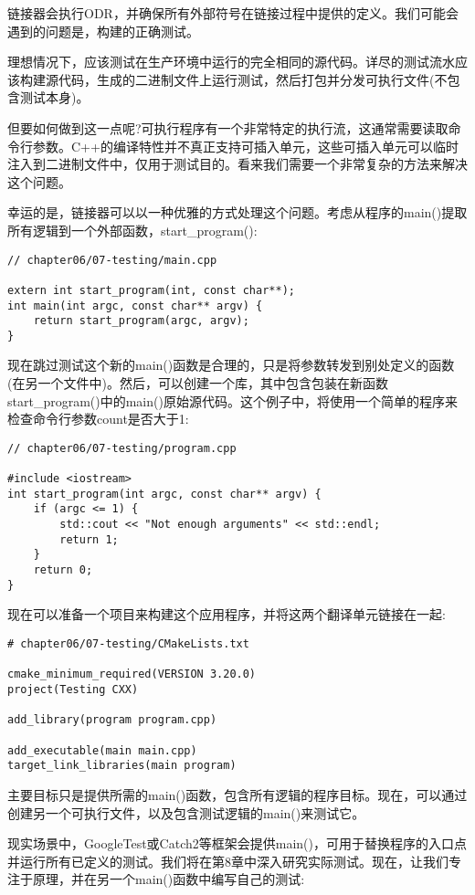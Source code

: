 链接器会执行ODR，并确保所有外部符号在链接过程中提供的定义。我们可能会遇到的问题是，构建的正确测试。

理想情况下，应该测试在生产环境中运行的完全相同的源代码。详尽的测试流水应该构建源代码，生成的二进制文件上运行测试，然后打包并分发可执行文件(不包含测试本身)。

但要如何做到这一点呢?可执行程序有一个非常特定的执行流，这通常需要读取命令行参数。C++的编译特性并不真正支持可插入单元，这些可插入单元可以临时注入到二进制文件中，仅用于测试目的。看来我们需要一个非常复杂的方法来解决这个问题。

幸运的是，链接器可以以一种优雅的方式处理这个问题。考虑从程序的main()提取所有逻辑到一个外部函数，start\_program():

\begin{lstlisting}[style=styleCXX]
// chapter06/07-testing/main.cpp

extern int start_program(int, const char**);
int main(int argc, const char** argv) {
	return start_program(argc, argv);
}
\end{lstlisting}

现在跳过测试这个新的main()函数是合理的，只是将参数转发到别处定义的函数(在另一个文件中)。然后，可以创建一个库，其中包含包装在新函数start\_program()中的main()原始源代码。这个例子中，将使用一个简单的程序来检查命令行参数count是否大于1:

\begin{lstlisting}[style=styleCXX]
// chapter06/07-testing/program.cpp

#include <iostream>
int start_program(int argc, const char** argv) {
	if (argc <= 1) {
		std::cout << "Not enough arguments" << std::endl;
		return 1;
	}
	return 0;
}
\end{lstlisting}

现在可以准备一个项目来构建这个应用程序，并将这两个翻译单元链接在一起:

\begin{lstlisting}[style=styleCMake]
# chapter06/07-testing/CMakeLists.txt

cmake_minimum_required(VERSION 3.20.0)
project(Testing CXX)

add_library(program program.cpp)

add_executable(main main.cpp)
target_link_libraries(main program)
\end{lstlisting}

主要目标只是提供所需的main()函数，包含所有逻辑的程序目标。现在，可以通过创建另一个可执行文件，以及包含测试逻辑的main()来测试它。

现实场景中，GoogleTest或Catch2等框架会提供main()，可用于替换程序的入口点并运行所有已定义的测试。我们将在第8章中深入研究实际测试。现在，让我们专注于原理，并在另一个main()函数中编写自己的测试:

